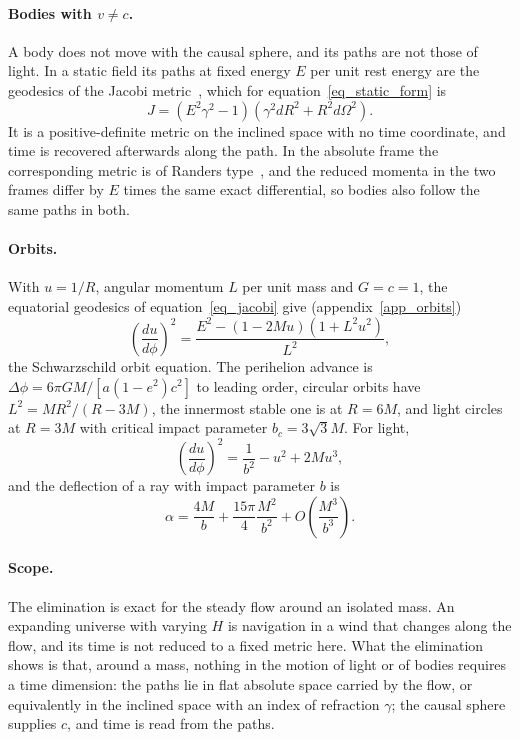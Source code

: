 \documentclass{iopjournal}
\begin{document}
\paragraph{Bodies with $v\neq c$.} A body does not move with the causal sphere, and its paths are not those of light. In a static field its paths at fixed energy $E$ per unit rest energy are the geodesics of the Jacobi metric~\cite{Gibbons2016Jacobi}, which for equation~\eqref{eq_static_form} is
\begin{equation}\label{eq_jacobi}
    J=\left(E^2\gamma^2-1\right)\left(\gamma^2dR^2+R^2d\Omega^2\right).
\end{equation}
It is a positive-definite metric on the inclined space with no time coordinate, and time is recovered afterwards along the path. In the absolute frame the corresponding metric is of Randers type~\cite{Chanda2019Jacobi}, and the reduced momenta in the two frames differ by $E$ times the same exact differential, so bodies also follow the same paths in both.

\paragraph{Orbits.} With $u=1/R$, angular momentum $L$ per unit mass and $G=c=1$, the equatorial geodesics of equation~\eqref{eq_jacobi} give (appendix~\ref{app_orbits})
\begin{equation}\label{eq_jacobi_orbit}
    \left(\frac{du}{d\phi}\right)^2=\frac{E^2-(1-2Mu)\left(1+L^2u^2\right)}{L^2},
\end{equation}
the Schwarzschild orbit equation. The perihelion advance is $\Delta\phi=6\pi GM/[a(1-e^2)c^2]$ to leading order, circular orbits have $L^2=MR^2/(R-3M)$, the innermost stable one is at $R=6M$, and light circles at $R=3M$ with critical impact parameter $b_c=3\sqrt3M$. For light,
\begin{equation}\label{eq_light_orbit}
    \left(\frac{du}{d\phi}\right)^2=\frac{1}{b^2}-u^2+2Mu^3,
\end{equation}
and the deflection of a ray with impact parameter $b$ is
\begin{equation}\label{eq_deflection}
    \alpha=\frac{4M}{b}+\frac{15\pi}{4}\frac{M^2}{b^2}+O\!\left(\frac{M^3}{b^3}\right).
\end{equation}

\paragraph{Scope.} The elimination is exact for the steady flow around an isolated mass. An expanding universe with varying $H$ is navigation in a wind that changes along the flow, and its time is not reduced to a fixed metric here. What the elimination shows is that, around a mass, nothing in the motion of light or of bodies requires a time dimension: the paths lie in flat absolute space carried by the flow, or equivalently in the inclined space with an index of refraction $\gamma$; the causal sphere supplies $c$, and time is read from the paths.
\end{document}
